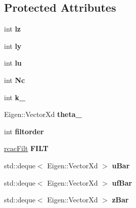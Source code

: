 \subsection*{Protected Attributes}
\begin{DoxyCompactItemize}
\item 
\mbox{\label{class_r_c_a_c_a92ae57de3b80c8249ee3a328592f3d06}} 
int {\bfseries lz}
\item 
\mbox{\label{class_r_c_a_c_aee0473f7ce8fa6a82bb5adddc48577fc}} 
int {\bfseries ly}
\item 
\mbox{\label{class_r_c_a_c_a6683eb31916f2ee9cbcf1d36d0f382e6}} 
int {\bfseries lu}
\item 
\mbox{\label{class_r_c_a_c_ac5e3bbd73052a1a888db85ad89b40d2a}} 
int {\bfseries Nc}
\item 
\mbox{\label{class_r_c_a_c_af63e5f8e3fd6ab9a896c5b07d572fe5e}} 
int {\bfseries k\+\_}
\item 
\mbox{\label{class_r_c_a_c_aff47c54eac89ed52c2bdd836376d7eed}} 
Eigen\+::\+Vector\+Xd {\bfseries theta\+\_}
\item 
\mbox{\label{class_r_c_a_c_a71d835fb0f8e32eab92832bf3a966155}} 
int {\bfseries filtorder}
\item 
\mbox{\label{class_r_c_a_c_a02f30c9c5a9af4d84de16e1e027489f4}} 
\hyperlink{structrcac_filt}{rcac\+Filt} {\bfseries F\+I\+LT}
\item 
\mbox{\label{class_r_c_a_c_ab087087d4dad63a40fbd7ead4b850c8c}} 
std\+::deque$<$ Eigen\+::\+Vector\+Xd $>$ {\bfseries u\+Bar}
\item 
\mbox{\label{class_r_c_a_c_a6eb81be8397d5605773db459d912f90d}} 
std\+::deque$<$ Eigen\+::\+Vector\+Xd $>$ {\bfseries uf\+Bar}
\item 
\mbox{\label{class_r_c_a_c_a06799c662a4c8203f642e17f8c86d33b}} 
std\+::deque$<$ Eigen\+::\+Vector\+Xd $>$ {\bfseries z\+Bar}
\item 

\end{DoxyCompactItemize}
